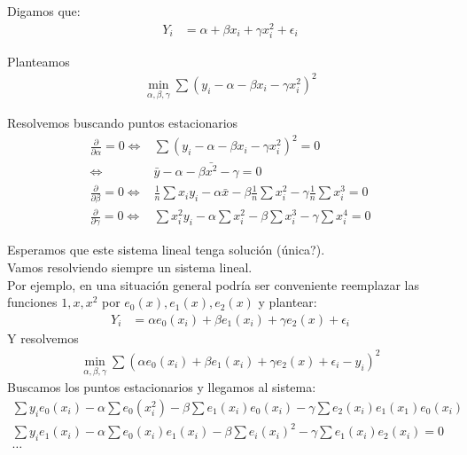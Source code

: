 \documentclass[10pt]{article}
\theoremstyle{plain}
\theoremstyle{definition}
\begin{document}
Digamos que:
\begin{align*}
Y_{i} &= \alpha + \beta x_{i} + \gamma x_{i}^2 + \epsilon_{i}
\end{align*}

Planteamos 
\begin{align*}
\min_{\alpha,\beta,\gamma} \sum (y_{i}-\alpha -\beta x_{i} -\gamma x_{i}^2)^2
\end{align*}

Resolvemos buscando puntos estacionarios
\begin{align*}
\frac{\partial}{\partial \alpha} = 0 \Leftrightarrow & \sum (y_{i}-\alpha-\beta x_{i} -\gamma x_{i}^2)^2 = 0\\
\Leftrightarrow & \bar{y} - \alpha - \beta \bar{x^2} - \gamma = 0\\
\frac{\partial}{\partial \beta} = 0 \Leftrightarrow & \frac{1}{n}\sum x_{i}y_{i} - \alpha \bar{x} - \beta \frac{1}{n} \sum x_{i}^2 - \gamma \frac{1}{n} \sum x_{i}^3 = 0\\
\frac{\partial}{\partial \gamma} = 0 \Leftrightarrow &  \sum x_{i}^2y_{i} - \alpha\sum x_{i}^2 - \beta \sum x_{i}^3 - \gamma \sum x_{i}^4 = 0
 \end{align*}
 
 Esperamos que este sistema lineal tenga solución (única?).\\
 
 Vamos resolviendo siempre un sistema lineal.\\
 
 Por ejemplo, en una situación general podría ser conveniente reemplazar las funciones $1,x,x^2$ por  $e_{0}(x),e_{1}(x), e_{2}(x)$ y plantear:
 \begin{align*}
 Y_{i} &= \alpha e_{0}(x_{i}) + \beta e_{1}(x_{i}) + \gamma e_{2}(x) + \epsilon_{i}
 \end{align*}
 Y resolvemos 
 \begin{align*}
 \min_{\alpha, \beta, \gamma} \sum (\alpha e_{0}(x_{i}) + \beta e_{1}(x_{i}) + \gamma e_{2}(x) + \epsilon_{i} - y_{i})^2
 \end{align*}
 Buscamos los puntos estacionarios y llegamos al sistema:
 \begin{align*}
 \sum y_{i}e_{0}(x_{i}) - \alpha\sum e_{0}(x_{i}^2) -\beta\sum e_{1}(x_{i})e_{0}(x_{i}) - \gamma\sum e_{2}(x_{i})e_{1}(x_{1})e_{0}(x_{i})\\
 \sum y_{i}e_{1}(x_{i}) - \alpha \sum e_{0}(x_{i})e_{1}(x_{i}) - \beta\sum e_{i}(x_{i})^2 - \gamma \sum e_{1}(x_{i})e_{2}(x_{i}) = 0\\
 \ldots
 \end{align*}
 
\end{document}
